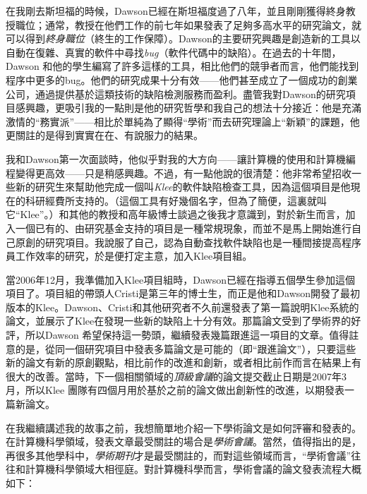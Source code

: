 \documentclass[12pt,UTF8,nofonts]{book}
\begin{document}
在我剛去斯坦福的時候，Dawson已經在斯坦福度過了八年，並且剛剛獲得終身教授職位；通常，教授在他們工作的前七年如果發表了足夠多高水平的研究論文，就可以得到\emph{終身職位}（終生的工作保障）。Dawson的主要研究興趣是創造新的工具以自動在復雜、真實的軟件中尋找\emph{bug}（軟件代碼中的缺陷）。在過去的十年間，Dawson 和他的學生編寫了許多這樣的工具，相比他們的競爭者而言，他們能找到程序中更多的bug。他們的研究成果十分有效——他們甚至成立了一個成功的創業公司，通過提供基於這類技術的缺陷檢測服務而盈利。盡管我對Dawson的研究項目感興趣，更吸引我的一點則是他的研究哲學和我自己的想法十分接近：他是充滿激情的“務實派”——相比於單純為了顯得“學術”而去研究理論上“新穎”的課題，他更關註的是得到實實在在、有說服力的結果。

我和Dawson第一次面談時，他似乎對我的大方向——讓計算機的使用和計算機編程變得更高效——只是稍感興趣。不過，有一點他說的很清楚：他非常希望招收一些新的研究生來幫助他完成一個叫\emph{Klee}的軟件缺陷檢查工具，因為這個項目是他現在的科研經費所支持的。（這個工具有好幾個名字，但為了簡便，這裏就叫它“Klee”。）和其他的教授和高年級博士談過之後我才意識到，對於新生而言，加入一個已有的、由研究基金支持的項目是一種常規現象，而並不是馬上開始進行自己原創的研究項目。我說服了自己，認為自動查找軟件缺陷也是一種間接提高程序員工作效率的研究，於是便打定主意，加入Klee項目組。

當2006年12月，我準備加入Klee項目組時，Dawson已經在指導五個學生參加這個項目了。項目組的帶頭人Cristi是第三年的博士生，而正是他和Dawson開發了最初版本的Klee。Dawson、Cristi和其他研究者不久前還發表了第一篇說明Klee系統的論文，並展示了Klee在發現一些新的缺陷上十分有效。那篇論文受到了學術界的好評，所以Dawson 希望保持這一勢頭，繼續發表幾篇跟進這一項目的文章。值得註意的是，從同一個研究項目中發表多篇論文是可能的（即“跟進論文”），只要這些新的論文有新的原創觀點，相比前作的改進和創新，或者相比前作而言在結果上有很大的改善。當時，下一個相關領域的\emph{頂級會議}的論文提交截止日期是2007年3月，所以Klee 團隊有四個月用於基於之前的論文做出創新性的改進，以期發表一篇新論文。

\breakline

在我繼續講述我的故事之前，我想簡單地介紹一下學術論文是如何評審和發表的。在計算機科學領域，發表文章最受關註的場合是\emph{學術會議}。當然，值得指出的是，再很多其他學科中，\emph{學術期刊}才是最受關註的，而對這些領域而言，“學術會議”往往和計算機科學領域大相徑庭。對計算機科學而言，學術會議的論文發表流程大概如下：
\end{document}

